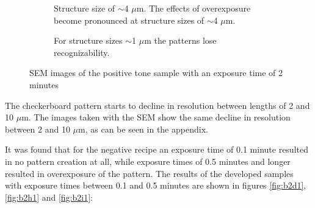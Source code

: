 \begin{figure}[ht]
\begin{subfigure}[t]{0.3\linewidth}
	\caption{Structure size of $\sim$4 $\mu$m. The effects of overexposure become pronounced at structure sizes of $\sim$4 $\mu$m.}
	\label{fig:b2d9_q9}
\end{subfigure}
\hspace*{5mm}
    \begin{subfigure}[t]{0.3\linewidth}
	\centering
	\caption{For structure sizes $\sim$1 $\mu$m the patterns lose recognizability.}
	\label{fig:b2d10_q11}
\end{subfigure}
\caption{SEM images of the positive tone sample with an exposure time of 2 minutes}
\end{figure}

The checkerboard pattern starts to decline in resolution between lengths of 2 and 10 $\mu$m. The images taken with the SEM show the same decline in resolution between 2 and 10 $\mu$m, as can be seen in the appendix.


It was found that for the negative recipe an exposure time of 0.1 minute resulted in no pattern creation at all, while exposure times of 0.5 minutes and longer resulted in overexposure of the pattern. The results of the developed samples with exposure times between 0.1 and 0.5 minutes are shown in figures \ref{fig:b2d1}, \ref{fig:b2h1} and \ref{fig:b2i1}:

